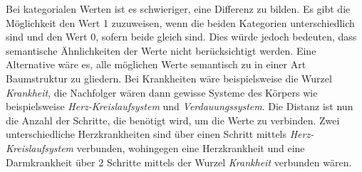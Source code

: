 Bei kategorialen Werten ist es schwieriger, eine Differenz zu bilden.
Es gibt die Möglichkeit den Wert 1 zuzuweisen, wenn die beiden Kategorien unterschiedlich sind und den Wert 0, sofern beide gleich sind. 
Dies würde jedoch bedeuten, dass semantische Ähnlichkeiten der Werte nicht berücksichtigt werden.
Eine Alternative wäre es, alle möglichen Werte semantisch zu in einer Art Baumstruktur zu gliedern. 
Bei Krankheiten wäre beispielsweise die Wurzel \textit{\dq Krankheit\dq}, die Nachfolger wären dann gewisse Systeme des Körpers wie beispielsweise \textit{\dq Herz-Kreislaufsystem\dq} und \textit{\dq Verdauungssystem\dq}.
Die Distanz ist nun die Anzahl der Schritte, die benötigt wird, um die Werte zu verbinden. 
Zwei unterschiedliche Herzkrankheiten sind über einen Schritt mittels \textit{\dq Herz-Kreislaufsystem\dq} verbunden, wohingegen eine Herzkrankheit und eine Darmkrankheit über 2 Schritte mittels der Wurzel \textit{\dq Krankheit\dq} verbunden wären.